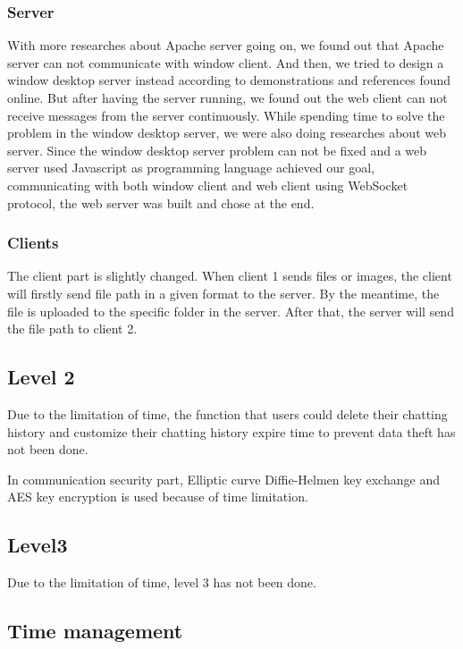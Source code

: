 \documentclass[a4paper,11pt]{article}
\begin{document}
\subsubsection{Server}

With more researches about Apache server going on, we found out that Apache server can not communicate with window client. And then, we tried to design a window desktop server instead according to demonstrations and references found online. But after having the server running, we found out the web client can not receive messages from the server continuously. While spending time to solve the problem in the window desktop server, we were also doing researches about web server.   Since the window desktop server problem can not be fixed and a web server used Javascript as programming language achieved our goal, communicating with both window client and web client using WebSocket protocol, the web server was built and chose at the end.  

 
\subsubsection{Clients}
The client part is slightly changed. When client 1 sends files or images, the client will firstly send file path in a given format to the server. By the meantime, the file is uploaded to the specific folder in the server. After that, the server will send the file path to client 2.

\subsection{Level 2}
Due to the limitation of time, the function that users could delete their chatting history and customize their chatting history expire time to prevent data theft has not been done. 


In communication security part, Elliptic curve Diffie-Helmen key exchange and AES key encryption is used because of time limitation. 

\subsection{Level3}
Due to the limitation of time, level 3 has not been done.

\subsection{Time management}
\end{document}
